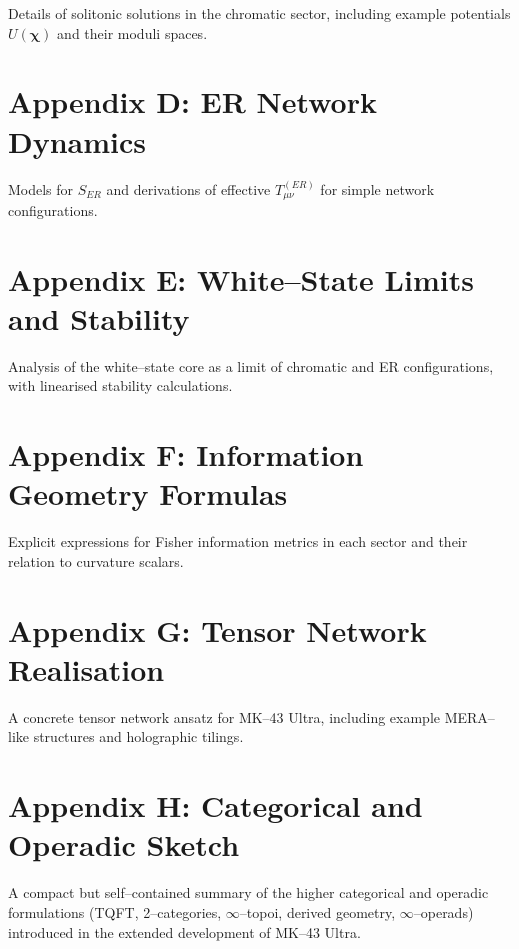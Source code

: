 Details of solitonic solutions in the chromatic sector, including example potentials $U(\bm{\chi})$ and their moduli spaces.

\chapter{Appendix D: ER Network Dynamics}

Models for $S_{ER}$ and derivations of effective $T^{(ER)}_{\mu\nu}$ for simple network configurations.

\chapter{Appendix E: White--State Limits and Stability}

Analysis of the white--state core as a limit of chromatic and ER configurations, with linearised stability calculations.

\chapter{Appendix F: Information Geometry Formulas}

Explicit expressions for Fisher information metrics in each sector and their relation to curvature scalars.

\chapter{Appendix G: Tensor Network Realisation}

A concrete tensor network ansatz for MK--43 Ultra, including example MERA--like structures and holographic tilings.

\chapter{Appendix H: Categorical and Operadic Sketch}

A compact but self--contained summary of the higher categorical and operadic formulations (TQFT, 2--categories, $\infty$--topoi, derived geometry, $\infty$--operads) introduced in the extended development of MK--43 Ultra.


\backmatter

